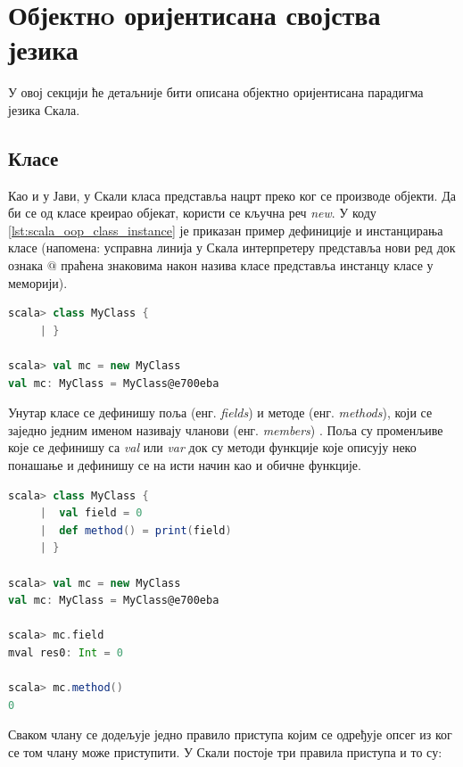 \documentclass[12pt,oneside]{memoir}
\begin{document}
\section{Објектнo оријентисана својства језика}
\label{sec:scala_oop}

У овој секцији ће детаљније бити описана објектно оријентисана парадигма језика Скала. 

\subsection{Класе}
\label{subsec:scala_klase}

Као и у Јави, у Скали класа представља нацрт преко ког се производе објекти. Да би се од класе креирао објекат, користи се кључна реч \textit{new}. У коду \ref{lst:scala_oop_class_instance} је приказан  пример дефиниције и инстанцирања класе (напомена: усправна линија у Скала интерпретеру представља нови ред док ознака $@$ праћена знаковима након назива класе представља инстанцу класе у меморији).

\begin{lstlisting}[language=Scala, caption={Дефиниција и инстанцирање класе у Скали}, label={lst:scala_oop_class_instance}]
scala> class MyClass {
     | }

scala> val mc = new MyClass
val mc: MyClass = MyClass@e700eba
\end{lstlisting}

Унутар класе се дефинишу поља (енг. \textit{fields}) и методе (енг. \textit{methods}), који се заједно једним именом називају чланови (енг. \textit{members}) \cite{scala_prog}. Поља су променљиве које се дефинишу са \textit{val} или \textit{var} док су методи функције које описују неко понашање и дефинишу се на исти начин као и обичне функције.

\begin{lstlisting}[language=Scala, caption={Чланови класе}, label={lst:scala_oop_members_class}]
scala> class MyClass {
     |  val field = 0
     |  def method() = print(field)
     | }

scala> val mc = new MyClass
val mc: MyClass = MyClass@e700eba

scala> mc.field
mval res0: Int = 0

scala> mc.method()
0
\end{lstlisting}

Сваком члану се додељује једно правило приступа којим се одређује опсег из ког се том члану може приступити. У Скали постоје три правила приступа и то су:
\end{document}
